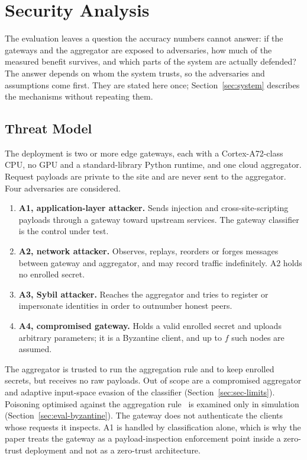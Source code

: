 \section{Security Analysis}
\label{sec:security}

The evaluation leaves a question the accuracy numbers cannot answer: if the gateways and the aggregator are exposed to adversaries, how much of the measured benefit survives, and which parts of the system are actually defended? The answer depends on whom the system trusts, so the adversaries and assumptions come first. They are stated here once; Section~\ref{sec:system} describes the mechanisms without repeating them.

\subsection{Threat Model}
\label{sec:sec-threat}
The deployment is two or more edge gateways, each with a Cortex-A72-class CPU, no GPU and a standard-library Python runtime, and one cloud aggregator. Request payloads are private to the site and are never sent to the aggregator. Four adversaries are considered.

\begin{enumerate}
  \item \textbf{A1, application-layer attacker.} Sends injection and cross-site-scripting payloads through a gateway toward upstream services. The gateway classifier is the control under test.
  \item \textbf{A2, network attacker.} Observes, replays, reorders or forges messages between gateway and aggregator, and may record traffic indefinitely. A2 holds no enrolled secret.
  \item \textbf{A3, Sybil attacker.} Reaches the aggregator and tries to register or impersonate identities in order to outnumber honest peers.
  \item \textbf{A4, compromised gateway.} Holds a valid enrolled secret and uploads arbitrary parameters; it is a Byzantine client, and up to $f$ such nodes are assumed.
\end{enumerate}

The aggregator is trusted to run the aggregation rule and to keep enrolled secrets, but receives no raw payloads. Out of scope are a compromised aggregator and adaptive input-space evasion of the classifier (Section~\ref{sec:sec-limits}). Poisoning optimised against the aggregation rule~\cite{fang2020} is examined only in simulation (Section~\ref{sec:eval-byzantine}). The gateway does not authenticate the clients whose requests it inspects. A1 is handled by classification alone, which is why the paper treats the gateway as a payload-inspection enforcement point inside a zero-trust deployment and not as a zero-trust architecture.

